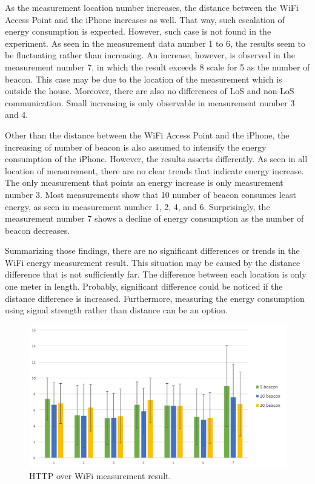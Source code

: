 \documentclass[journal]{vgtc}                %
\begin{document}
As the measurement location number increases, the distance between the WiFi Access Point and the iPhone increases as well. That way, such escalation of energy consumption is expected. However, such case is not found in the experiment. As seen in the measurement data number 1 to 6, the results seem to be fluctuating rather than increasing. An increase, however, is observed in the measurement number 7, in which the result exceeds 8 scale for 5 as the number of beacon. This case may be due to the location of the measurement which is outside the house. Moreover, there are also no differences of LoS and non-LoS communication. Small increasing is only observable in measurement number 3 and 4.

Other than the distance between the WiFi Access Point and the iPhone, the increasing of number of beacon is also assumed to intensify the energy consumption of the iPhone. However, the results asserts differently. As seen in all location of measurement, there are no clear trends that indicate energy increase. The only measurement that points an energy increase is only measurement number 3. Most measurements show that 10 number of beacon consumes least energy, as seen in measurement number 1, 2, 4, and 6. Surprisingly, the measurement number 7 shows a decline of energy consumption as the number of beacon decreases.

Summarizing those findings, there are no significant differences or trends in the WiFi energy measurement result. This situation may be caused by the distance difference that is not sufficiently far. The difference between each location is only one meter in length. Probably, significant difference could be noticed if the distance difference is increased. Furthermore, measuring the energy consumption using signal strength rather than distance can be an option.

\begin{figure}
  \centering
    \includegraphics[width=.5\textwidth]{wifi}
  \caption{HTTP over WiFi measurement result.}
  \label{fig:wifi-result}
\end{figure}
\end{document}
